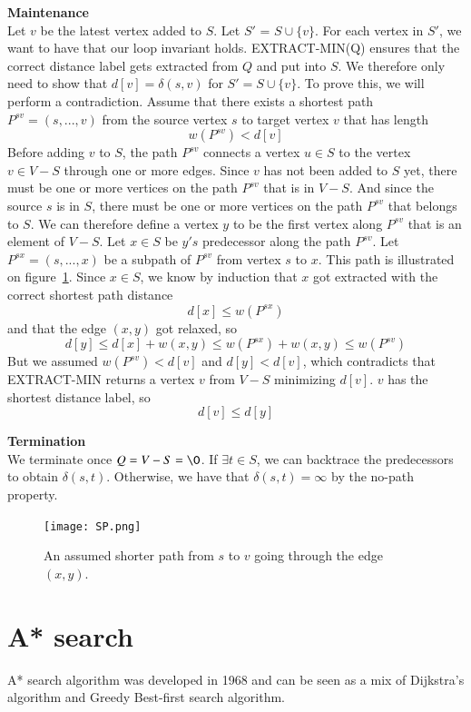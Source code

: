 \documentclass[11pt]{article}
\begin{document}
\noindent \textbf{Maintenance}\\
Let $v$ be the latest vertex added to $S$. Let $S'$ = $S \cup \{v\}$. For each vertex in $S'$, we want to have that our loop invariant holds. EXTRACT-MIN(Q) ensures that the correct distance label gets extracted from $Q$ and put into $S$. We therefore only need to show that $d[v]=\delta(s,v)$ for $S'=S \cup \{v\}$. To prove this, we will perform a contradiction. Assume that there exists a shortest path $P^{sv}=(s, ..., v)$ from the source vertex $s$ to target vertex $v$ that has length $$w(P^{sv}) < d[v]$$
Before adding $v$ to $S$, the path $P^{sv}$ connects a vertex $u\in S$ to the vertex $v\in V-S$ through one or more edges. Since $v$ has not been added to $S$ yet, there must be one or more vertices on the path $P^{sv}$ that is in $V-S$. And since the source $s$ is in $S$, there must be one or more vertices on the path $P^{sv}$ that belongs to $S$. We can therefore define a vertex $y$ to be the first vertex along $P^{sv}$ that is an element of $V-S$. Let $x\in S$ be $y's$ predecessor along the path $P^{sv}$. Let $P^{sx}=(s, ..., x)$ be a subpath of $P^{sv}$ from vertex $s$ to $x$. This path is illustrated on figure~\ref{fig:eyy}. Since $x \in S$, we know by induction that $x$ got extracted with the correct shortest path distance $$d[x] \leq w(P^{sx})$$and that the edge $(x,y)$ got relaxed, so $$d[y] \leq d[x]+w(x,y) \leq w(P^{sx}) + w(x,y) \leq w(P^{sv})$$But we assumed $w(P^{sv}) < d[v]$ and $d[y] < d[v]$, which contradicts that EXTRACT-MIN returns a vertex $v$ from $V-S$ minimizing $d[v]$. $v$ has the shortest distance label, so $$d[v] \leq d[y]$$

\noindent \textbf{Termination}\\
We terminate once $Q = V-S =\O$. If $\exists t \in S$, we can backtrace the predecessors to obtain $\delta(s,t)$. Otherwise, we have that $\delta(s,t) = \infty$ by the no-path property.\\

\begin{figure}[H]
\centering
\texttt{[image: SP.png]}
\caption{An assumed shorter path from $s$ to $v$ going through the edge $(x,y)$.}
\label{fig:eyy}
\end{figure}

\section{A* search}
A* search algorithm was developed in 1968 and can be seen as a mix of Dijkstra's algorithm and Greedy Best-first search algorithm. 
\end{document}
